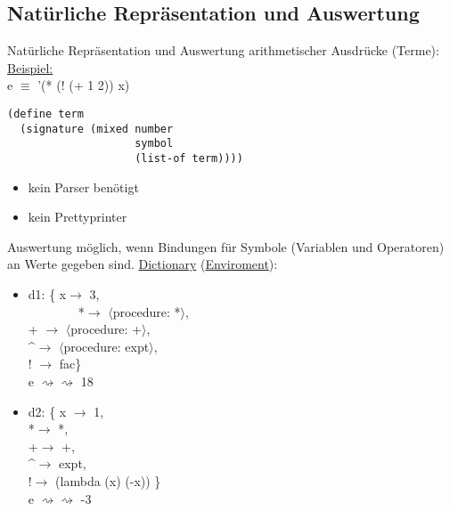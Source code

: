 \documentclass[a4paper,12pt]{article}
\newcommand{\la}{$\langle$}
\newcommand{\ra}{$\rangle$}
\begin{document}
\subsection{Natürliche Repräsentation und Auswertung}
Natürliche Repräsentation und Auswertung arithmetischer Ausdrücke (Terme):\\
\uline{Beispiel:}\\
e $\equiv$ '(* (! (+ 1 2)) x) %
\begin{lstlisting}[style=customc]
(define term
  (signature (mixed number
                    symbol
                    (list-of term))))
\end{lstlisting}
\begin{itemize}
\item kein Parser benötigt
\item kein Prettyprinter
\end{itemize}
Auswertung möglich, wenn Bindungen für Symbole (Variablen und Operatoren) an Werte gegeben sind. \uline{Dictionary} (\uline{Enviroment}):
\begin{itemize}
\item d1: \{ x$\rightarrow$ 3,\\
\ \ \ \ \ \ \ \  *$\rightarrow$ \la procedure: *\ra,\\
+ $\rightarrow$ \la procedure: +\ra,\\
\textasciicircum $\rightarrow$ \la procedure: expt\ra,\\
! $\rightarrow$ fac\}\\
e $\rightsquigarrow\rightsquigarrow$ 18
\item d2: \{ x $\rightarrow$ 1,\\
*$\rightarrow$ *,\\
+$\rightarrow$ +,\\
\textasciicircum$\rightarrow$ expt,\\
!$\rightarrow$ (lambda (x) (-x)) \}\\
e $\rightsquigarrow\rightsquigarrow$ -3
\end{itemize}
\end{document}
